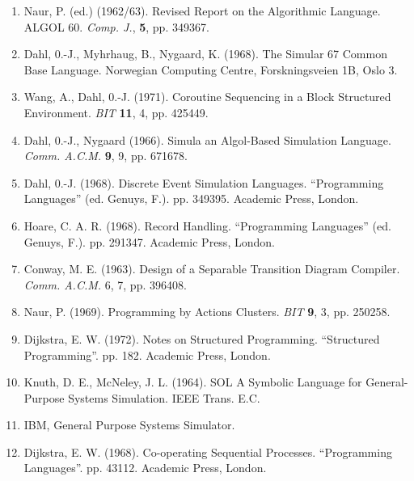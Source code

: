\begin{enumerate}[leftmargin=*, itemsep=.1em, wide=0pt, align=left, label=(\arabic*)]
	\item \label{ref:1}
	Naur, P. (ed.) (1962/63). Revised Report on the Algorithmic Language. ALGOL 60. \textit{Comp. J.}, \textbf{5}, pp. 349\textendash{}367.
	
	\item \label{ref:2}
	Dahl, 0.-J., Myhrhaug, B., Nygaard, K. (1968). The Simular 67 Common Base Language. Norwegian Computing Centre, Forskningsveien 1B, Oslo 3.
	
	\item \label{ref:3}
	Wang, A., Dahl, 0.-J. (1971). Coroutine Sequencing in a Block Structured Environment. \textit{BIT} \textbf{11}, 4, pp. 425\textendash{}449.
	
	\item \label{ref:4}
	Dahl, 0.-J., Nygaard (1966). Simula \textemdash{} an Algol-Based Simulation Language. \textit{Comm. A.C.M.} \textbf{9}, 9, pp. 671\textendash{}678. 
	
	\item \label{ref:5}
	Dahl, 0.-J. (1968). Discrete Event Simulation Languages. ``Programming Languages'' (ed. Genuys, F.). pp. 349\textendash{}395. Academic Press, London.
	
	\item \label{ref:6}
	Hoare, C. A. R. (1968). Record Handling. ``Programming Languages'' (ed. Genuys, F.). pp. 291\textendash{}347. Academic Press, London.
	
	\item \label{ref:7}
	Conway, M. E. (1963). Design of a Separable Transition \textemdash{} Diagram Compiler. \textit{Comm. A.C.M.} 6, 7, pp. 396\textendash{}408.
	
	\item \label{ref:8}
	Naur, P. (1969). Programming by Actions Clusters. \textit{BIT} \textbf{9}, 3, pp. 250\textendash{}258.
	
	\item \label{ref:9}
	Dijkstra, E. W. (1972). Notes on Structured Programming. ``Structured Programming''. pp. 1\textendash{}82. Academic Press, London.
	
	\item \label{ref:10}
	Knuth, D. E., McNeley, J. L. (1964). SOL \textemdash{} A Symbolic Language for General-Purpose Systems Simulation. IEEE Trans. E.C.
	
	\item \label{ref:11}
	IBM, General Purpose Systems Simulator.
	
	\item \label{ref:12}
	Dijkstra, E. W. (1968). Co-operating Sequential Processes. ``Programming Languages''. pp. 43\textendash{}112. Academic Press, London.
\end{enumerate}